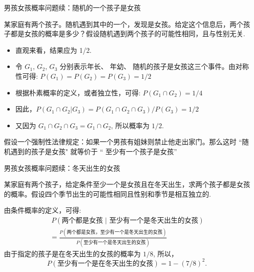 %

\begin{frame}{男孩女孩概率问题续：随机的一个孩子是女孩}
    \begin{exam}
        某家庭有两个孩子。随机遇到其中的一个，发现是女孩。给定这个信息后，两个孩子都是女孩的概率是多少？假设随机遇到两个孩子的可能性相同，且与性别无关.
    \end{exam}

    \begin{jieda}
        \begin{itemize}[<+-|alert@+>]
            \item 直观来看，结果应为 1/2.
            \item 令 $G_{1}$, $G_{2}$, $G_{3}$ 分别表示年长、 年幼、 随机的孩子是女孩这三个事件。由对称性可得: $P (G_{1})=P (G_{2})=P (G_{3})=1/2$
            \item 根据朴素概率的定义，或者独立性，可得: $P (G_{1}\cap G_{2})=1/4$
            \item 因此，$P (G_{1}\cap G_{2}|G_{3})=P (G_{1}\cap G_{2}\cap G_{3})/P (G_{3})=1/2$
            \item 又因为 $G_{1}\cap G_{2}\cap G_{3}=G_{1}\cap G_{2}$, 所以概率为 $1/2$.
        \end{itemize}
    \end{jieda}
	\pause
	\begin{rmk}
	假设一个强制性法律规定：如果一个男孩有姐妹则禁止他走出家门。那么这时 ``随机遇到的孩子是女孩" 就等价于 `` 至少有一个孩子是女孩”
	\end{rmk}

\end{frame}

%
\begin{frame}{男孩女孩概率问题续：冬天出生的女孩}
\begin{exam}
	某家庭有两个孩子，给定条件至少一个是女孩且在冬天出生，求两个孩子都是女孩的概率。假设四个季节出生的可能性相同且性别和季节是相互独立的.
\end{exam}
\pause

    \begin{jieda}
        由条件概率的定义，可得:
        \begin{align*}
            \ P (\mbox{两个都是女孩 | 至少有一个是冬天出生的女孩})\\
            =\frac{P (\mbox{两个都是女孩，至少有一个是冬天出生的女孩})}{P (\mbox{至少有一个是冬天出生的女孩})}
        \end{align*}\pause
		由于指定的孩子是在冬天出生的女孩的概率为 $1/8$, 所以，$$P (\mbox{至少有一个是在冬天出生的女孩}) = 1 - (7/8)^2.$$
    \end{jieda}
\end{frame}


